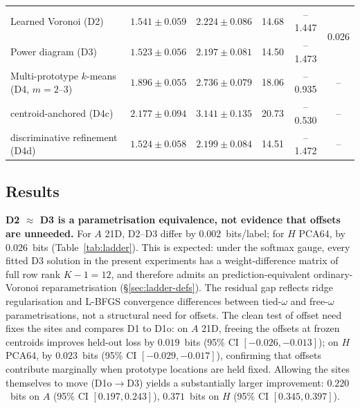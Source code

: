 \documentclass[11pt]{article}
\begin{document}
\begin{table}[t]
{\begin{tabular}{lccccc}
Learned Voronoi (D2) & $1.541\pm0.059$ & $2.224\pm0.086$ & 14.68 & --1.447 & \multirow{2}{*}{0.026} \\
Power diagram (D3) & $1.523\pm0.056$ & $2.197\pm0.081$ & 14.50 & --1.473 & \\
Multi-prototype $k$-means (D4, $m=2$--$3$) & $1.896\pm0.055$ & $2.736\pm0.079$ & 18.06 & --0.935 & -- \\
\quad centroid-anchored (D4c) & $2.177\pm0.094$ & $3.141\pm0.135$ & 20.73 & --0.530 & -- \\
\quad discriminative refinement (D4d) & $1.524\pm0.058$ & $2.199\pm0.084$ & 14.51 & --1.472 & -- \\
\bottomrule
\end{tabular}%
}
\end{table}

\subsection{Results}

\textbf{D2 $\approx$ D3 is a parametrisation equivalence, not evidence that offsets are unneeded.} For $A$ 21D, D2--D3 differ by $0.002$~bits/label; for $H$ PCA64, by $0.026$~bits (Table~\ref{tab:ladder}). This is expected: under the softmax gauge, every fitted D3 solution in the present experiments has a weight-difference matrix of full row rank $K-1=12$, and therefore admits an prediction-equivalent ordinary-Voronoi reparametrisation (\S\ref{sec:ladder-defs}). The residual gap reflects ridge regularisation and L-BFGS convergence differences between tied-$\omega$ and free-$\omega$ parametrisations, not a structural need for offsets. The clean test of offset need fixes the sites and compares D1 to D1o: on $A$ 21D, freeing the offsets at frozen centroids improves held-out loss by $0.019$~bits (95\% CI $[-0.026, -0.013]$); on $H$ PCA64, by $0.023$~bits (95\% CI $[-0.029, -0.017]$), confirming that offsets contribute marginally when prototype locations are held fixed. Allowing the sites themselves to move (D1o$\to$D3) yields a substantially larger improvement: $0.220$~bits on $A$ (95\% CI $[0.197, 0.243]$), $0.371$~bits on $H$ (95\% CI $[0.345, 0.397]$).
\end{document}
